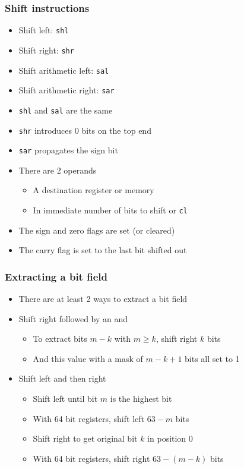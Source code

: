 \documentclass{beamer}
\begin{document}
\begin{frame}
    \frametitle{Shift instructions}
    \begin{itemize}
        \item Shift left: {\tt shl}
        \item Shift right: {\tt shr}
        \item Shift arithmetic left: {\tt sal}
        \item Shift arithmetic right: {\tt sar}
        \item {\tt shl} and {\tt sal} are the same
        \item {\tt shr} introduces 0 bits on the top end
        \item {\tt sar} propagates the sign bit
        \item There are 2 operands
        \begin{itemize}
            \item A destination register or memory
            \item In immediate number of bits to shift or {\tt cl} 
        \end{itemize}
        \item The sign and zero flags are set (or cleared)
        \item The carry flag is set to the last bit shifted out
    \end{itemize}
\end{frame}

\begin{frame}
    \frametitle{Extracting a bit field}
    \begin{itemize}
        \item There are at least 2 ways to extract a bit field
        \item Shift right followed by an and
        \begin{itemize}
            \item To extract bits $m-k$ with $m \ge k$, shift right $k$ bits
            \item And this value with a mask of $m-k+1$ bits all set to 1
        \end{itemize}
        \item Shift left and then right
        \begin{itemize}
            \item Shift left until bit $m$ is the highest bit
            \item With 64 bit registers, shift left $63-m$ bits
            \item Shift right to get original bit $k$ in position 0
            \item With 64 bit registers, shift right $63-(m-k)$ bits
        \end{itemize}
    \end{itemize}
\end{frame}
\end{document}
